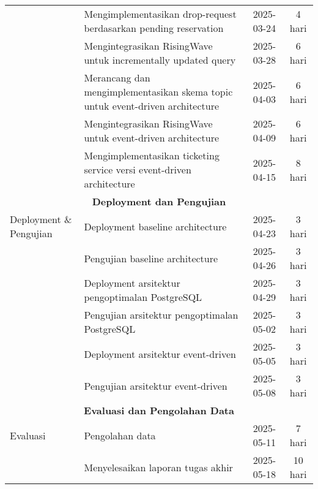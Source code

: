\begin{center}
\begin{longtable}{|p{}|p{}|c|c|}
                                & Mengimplementasikan drop-request berdasarkan pending reservation              & 2025-03-24             & 4 hari          \\
                                & Mengintegrasikan RisingWave untuk incrementally updated query                 & 2025-03-28             & 6 hari          \\
                                & Merancang dan mengimplementasikan skema topic untuk event-driven architecture & 2025-04-03             & 6 hari          \\
                                & Mengintegrasikan RisingWave untuk event-driven architecture                   & 2025-04-09             & 6 hari          \\
                                & Mengimplementasikan ticketing service versi event-driven architecture         & 2025-04-15             & 8 hari          \\
        \hline
        \multicolumn{4}{|c|}{\textbf{Deployment dan Pengujian}}                                                                                            \\
        \hline
        Deployment \& Pengujian & Deployment baseline architecture                                              & 2025-04-23             & 3 hari          \\
                                & Pengujian baseline architecture                                               & 2025-04-26             & 3 hari          \\
                                & Deployment arsitektur pengoptimalan PostgreSQL                                & 2025-04-29             & 3 hari          \\
                                & Pengujian arsitektur pengoptimalan PostgreSQL                                 & 2025-05-02             & 3 hari          \\
                                & Deployment arsitektur event-driven                                            & 2025-05-05             & 3 hari          \\
                                & Pengujian arsitektur event-driven                                             & 2025-05-08             & 3 hari          \\
        \hline
        \multicolumn{4}{|c|}{\textbf{Evaluasi dan Pengolahan Data}}                                                                                        \\
        \hline
        Evaluasi                & Pengolahan data                                                               & 2025-05-11             & 7 hari          \\
                                & Menyelesaikan laporan tugas akhir                                             & 2025-05-18             & 10 hari         \\
        \hline
    \end{longtable}
\end{center}